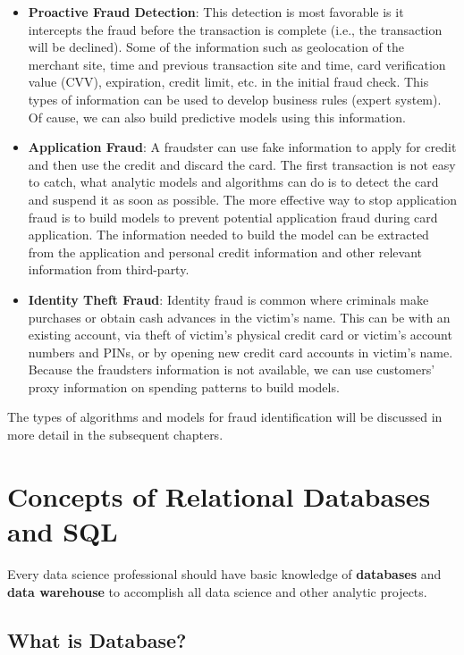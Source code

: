 \documentclass[
]{book}
\begin{document}
\begin{itemize}
\item
  \textbf{Proactive Fraud Detection}: This detection is most favorable is it intercepts the fraud before the transaction is complete (i.e., the transaction will be declined). Some of the information such as geolocation of the merchant site, time and previous transaction site and time, card verification value (CVV), expiration, credit limit, etc. in the initial fraud check. This types of information can be used to develop business rules (expert system). Of cause, we can also build predictive models using this information.
\item
  \textbf{Application Fraud}: A fraudster can use fake information to apply for credit and then use the credit and discard the card. The first transaction is not easy to catch, what analytic models and algorithms can do is to detect the card and suspend it as soon as possible. The more effective way to stop application fraud is to build models to prevent potential application fraud during card application. The information needed to build the model can be extracted from the application and personal credit information and other relevant information from third-party.
\item
  \textbf{Identity Theft Fraud}: Identity fraud is common where criminals make purchases or obtain cash advances in the victim's name. This can be with an existing account, via theft of victim's physical credit card or victim's account numbers and PINs, or by opening new credit card accounts in victim's name. Because the fraudsters information is not available, we can use customers' proxy information on spending patterns to build models.
\end{itemize}

The types of algorithms and models for fraud identification will be discussed in more detail in the subsequent chapters.

\hypertarget{concepts-of-relational-databases-and-sql}{%
\section{Concepts of Relational Databases and SQL}\label{concepts-of-relational-databases-and-sql}}

Every data science professional should have basic knowledge of \textbf{databases} and \textbf{data warehouse} to accomplish all data science and other analytic projects.

\hypertarget{what-is-database}{%
\subsection{What is Database?}\label{what-is-database}}
\end{document}
